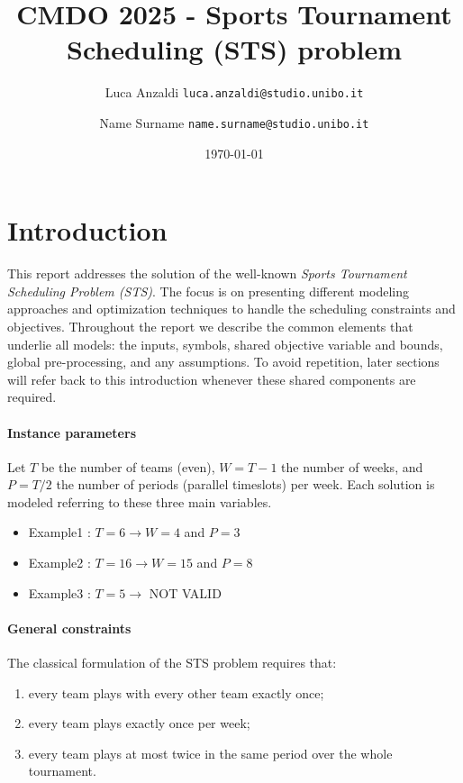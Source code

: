 \documentclass{article}
\title{CMDO 2025 - Sports Tournament Scheduling
(STS) problem}
\author{%
Luca Anzaldi \texttt{luca.anzaldi@studio.unibo.it} \and
Name Surname \texttt{name.surname@studio.unibo.it}
}
\date{\today}
\begin{document}
\maketitle

\section{Introduction}
This report addresses the solution of the well-known \emph{Sports Tournament Scheduling Problem (STS)}.
The focus is on presenting different modeling approaches and optimization techniques to handle the scheduling constraints and objectives.  
Throughout the report we describe the common elements that underlie all models: the inputs, symbols, shared objective variable and bounds, global pre-processing, and any assumptions. 
To avoid repetition, later sections will refer back to this introduction whenever these shared components are required.

\paragraph{Instance parameters}
Let \(T\) be the number of teams (even), \(W=T-1\) the number of weeks, and \(P=T/2\) the number of periods (parallel timeslots) per week.
Each solution is modeled referring to these three main variables.

\begin{itemize}
    \item Example1 : $ T = 6 \xrightarrow{} W = 4 $ and  $ P = 3 $
    \item Example2 : $ T = 16 \xrightarrow{} W = 15 $ and  $ P = 8 $
    \item Example3 : $ T = 5  \xrightarrow{} $ NOT VALID 
\end{itemize}

\paragraph{General constraints}
The classical formulation of the STS problem requires that:
\begin{enumerate}
    \item every team plays with every other team exactly once;
    \item every team plays exactly once per week;
    \item every team plays at most twice in the same period over the whole tournament.
\end{enumerate}
\end{document}
